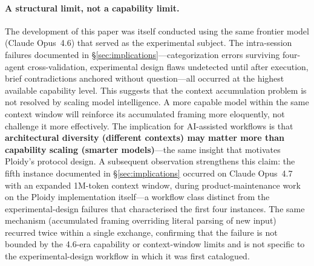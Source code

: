 \documentclass[11pt]{article}
\begin{document}
\paragraph{A structural limit, not a capability limit.}
The development of this paper was itself conducted using the same frontier model (Claude Opus~4.6) that served as the experimental subject. The intra-session failures documented in \S\ref{sec:implications}---categorization errors surviving four-agent cross-validation, experimental design flaws undetected until after execution, brief contradictions anchored without question---all occurred at the highest available capability level. This suggests that the context accumulation problem is not resolved by scaling model intelligence. A more capable model within the same context window will reinforce its accumulated framing more eloquently, not challenge it more effectively. The implication for AI-assisted workflows is that \textbf{architectural diversity (different contexts) may matter more than capability scaling (smarter models)}---the same insight that motivates Ploidy's protocol design. A subsequent observation strengthens this claim: the fifth instance documented in \S\ref{sec:implications} occurred on Claude Opus~4.7 with an expanded 1M-token context window, during product-maintenance work on the Ploidy implementation itself---a workflow class distinct from the experimental-design failures that characterised the first four instances. The same mechanism (accumulated framing overriding literal parsing of new input) recurred twice within a single exchange, confirming that the failure is not bounded by the 4.6-era capability or context-window limits and is not specific to the experimental-design workflow in which it was first catalogued.
\end{document}
